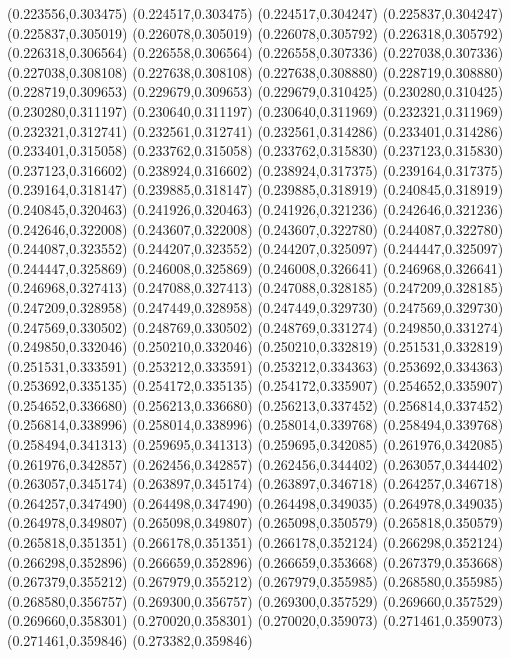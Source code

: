 (0.223556,0.303475)
(0.224517,0.303475)
(0.224517,0.304247)
(0.225837,0.304247)
(0.225837,0.305019)
(0.226078,0.305019)
(0.226078,0.305792)
(0.226318,0.305792)
(0.226318,0.306564)
(0.226558,0.306564)
(0.226558,0.307336)
(0.227038,0.307336)
(0.227038,0.308108)
(0.227638,0.308108)
(0.227638,0.308880)
(0.228719,0.308880)
(0.228719,0.309653)
(0.229679,0.309653)
(0.229679,0.310425)
(0.230280,0.310425)
(0.230280,0.311197)
(0.230640,0.311197)
(0.230640,0.311969)
(0.232321,0.311969)
(0.232321,0.312741)
(0.232561,0.312741)
(0.232561,0.314286)
(0.233401,0.314286)
(0.233401,0.315058)
(0.233762,0.315058)
(0.233762,0.315830)
(0.237123,0.315830)
(0.237123,0.316602)
(0.238924,0.316602)
(0.238924,0.317375)
(0.239164,0.317375)
(0.239164,0.318147)
(0.239885,0.318147)
(0.239885,0.318919)
(0.240845,0.318919)
(0.240845,0.320463)
(0.241926,0.320463)
(0.241926,0.321236)
(0.242646,0.321236)
(0.242646,0.322008)
(0.243607,0.322008)
(0.243607,0.322780)
(0.244087,0.322780)
(0.244087,0.323552)
(0.244207,0.323552)
(0.244207,0.325097)
(0.244447,0.325097)
(0.244447,0.325869)
(0.246008,0.325869)
(0.246008,0.326641)
(0.246968,0.326641)
(0.246968,0.327413)
(0.247088,0.327413)
(0.247088,0.328185)
(0.247209,0.328185)
(0.247209,0.328958)
(0.247449,0.328958)
(0.247449,0.329730)
(0.247569,0.329730)
(0.247569,0.330502)
(0.248769,0.330502)
(0.248769,0.331274)
(0.249850,0.331274)
(0.249850,0.332046)
(0.250210,0.332046)
(0.250210,0.332819)
(0.251531,0.332819)
(0.251531,0.333591)
(0.253212,0.333591)
(0.253212,0.334363)
(0.253692,0.334363)
(0.253692,0.335135)
(0.254172,0.335135)
(0.254172,0.335907)
(0.254652,0.335907)
(0.254652,0.336680)
(0.256213,0.336680)
(0.256213,0.337452)
(0.256814,0.337452)
(0.256814,0.338996)
(0.258014,0.338996)
(0.258014,0.339768)
(0.258494,0.339768)
(0.258494,0.341313)
(0.259695,0.341313)
(0.259695,0.342085)
(0.261976,0.342085)
(0.261976,0.342857)
(0.262456,0.342857)
(0.262456,0.344402)
(0.263057,0.344402)
(0.263057,0.345174)
(0.263897,0.345174)
(0.263897,0.346718)
(0.264257,0.346718)
(0.264257,0.347490)
(0.264498,0.347490)
(0.264498,0.349035)
(0.264978,0.349035)
(0.264978,0.349807)
(0.265098,0.349807)
(0.265098,0.350579)
(0.265818,0.350579)
(0.265818,0.351351)
(0.266178,0.351351)
(0.266178,0.352124)
(0.266298,0.352124)
(0.266298,0.352896)
(0.266659,0.352896)
(0.266659,0.353668)
(0.267379,0.353668)
(0.267379,0.355212)
(0.267979,0.355212)
(0.267979,0.355985)
(0.268580,0.355985)
(0.268580,0.356757)
(0.269300,0.356757)
(0.269300,0.357529)
(0.269660,0.357529)
(0.269660,0.358301)
(0.270020,0.358301)
(0.270020,0.359073)
(0.271461,0.359073)
(0.271461,0.359846)
(0.273382,0.359846)

